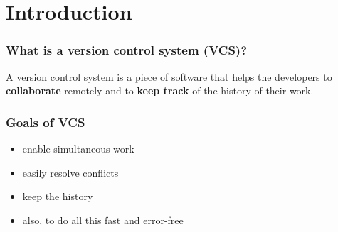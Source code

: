 \documentclass{beamer}
\begin{document}
\section{Introduction}
\begin{frame}
\frametitle{What is a version control system (VCS)?}


A version control system is a piece of software that helps the
developers to \textbf{collaborate} remotely and to \textbf{keep track} of the
history of their work. 

\end{frame}


\begin{frame}
\frametitle{Goals of VCS}

\begin{itemize}
\item enable simultaneous work
\item easily resolve conflicts
\item keep the history
\item also, to do all this fast and error-free
\end{itemize}
\end{frame}
\end{document}
